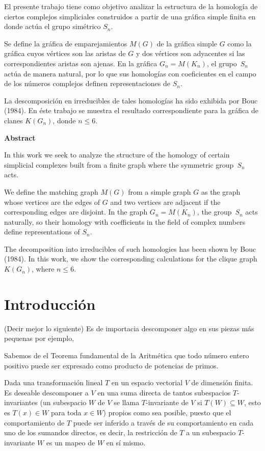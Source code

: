 \documentclass[12pt]{book}
\theoremstyle{definition}
\newcounter{in}
\newcounter{ini}
\begin{document}
El presente trabajo tiene como objetivo analizar la estructura de
la homología de ciertos complejos simpliciales construidos a partir de una
gráfica simple finita en donde actúa el grupo simétrico $S_{n}$.

Se define la gráfica de emparejamientos $M(G)$ de la gráfica simple
$G$ como la gráfica cuyos vértices son las aristas de $G$ y dos
vértices son adyacentes si las correspondientes aristas son ajenas. En
la gráfica $G_{n}=M(K_{n})$, el grupo~$S_{n}$ actúa de manera natural, por
lo que sus homologías con coeficientes en el campo de los números complejos definen
representaciones de $S_{n}$. 

La descomposición en irreducibles de tales homologías ha sido exhibida
por Bouc (1984). En éste trabajo se muestra el resultado correspondiente para la
gráfica de clanes $K(G_{n})$, donde $n\leq 6$.

\vspace{2cm}

\begin{flushleft}
  {\bfseries\Large Abstract}
\end{flushleft}

In this work we seek to analyze the structure of the homology of
certain simplicial complexes built from a finite graph where the
symmetric group~$S_{n}$ acts. 

We define the matching graph $M(G)$ from a simple graph $G$ as 
the graph whose vertices are the edges of $G$ and two vertices are
adjacent if the corresponding edges are disjoint. In the graph
$G_{n}=M(K_{n})$, the group~$S_{n}$ acts naturally, so their homology
with coefficients in the field of complex numbers define representations of $S_{n}$. 

The decomposition into irreducibles of such homologies has been shown
by Bouc (1984). In this work, we show the corresponding calculations for
the clique graph $K(G_{n})$, where $n\leq 6$.

\chapter*{Introducción}

(Decir mejor lo siguiente) Es de importacia descomponer algo en sus piezas más pequenas por
ejemplo,

Sabemos de el Teorema fundamental de la Aritmética que todo número
entero positivo puede ser expresado como producto de potencias de
primos.

Dada una transformación lineal $T$ en un espacio vectorial $V$ de
dimensión finita. Es deseable descomponer a $V$
en una suma directa de tantos subespacios $T$-invariantes  (un
subespacio $W$ de $V$ se llama $T$-invariante de $V$ si
$T(W)\subseteq W$, esto es $T(x)\in W$ para toda $x\in W$) propios
como sea posible, puesto que el comportamiento de $T$ puede ser
inferido a través de su comportamiento en cada uno de los sumandos
directos, es decir, la restricción de $T$ a un subespacio
$T$-invariante $W$ es un mapeo de $W$ en sí mismo. 
\end{document}
